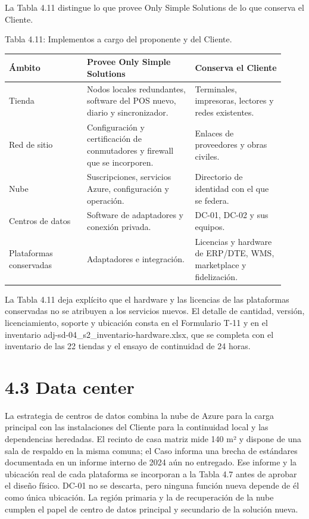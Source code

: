 \documentclass[11pt]{article}
\begin{document}
La Tabla 4.11 distingue lo que provee Only Simple Solutions de lo que conserva el Cliente.

Tabla 4.11: Implementos a cargo del proponente y del Cliente.

\begin{longtable}{@{}p{0.26\linewidth}p{0.36\linewidth}p{0.30\linewidth}@{}}
\toprule Ámbito & Provee Only Simple Solutions & Conserva el Cliente \\
\midrule\endhead\bottomrule\endlastfoot
Tienda & Nodos locales redundantes, software del POS nuevo, diario y sincronizador. & Terminales, impresoras, lectores y redes existentes. \\
Red de sitio & Configuración y certificación de conmutadores y firewall que se incorporen. & Enlaces de proveedores y obras civiles. \\
Nube & Suscripciones, servicios Azure, configuración y operación. & Directorio de identidad con el que se federa. \\
Centros de datos & Software de adaptadores y conexión privada. & DC-01, DC-02 y sus equipos. \\
Plataformas conservadas & Adaptadores e integración. & Licencias y hardware de ERP/DTE, WMS, marketplace y fidelización. \\
\end{longtable}

La Tabla 4.11 deja explícito que el hardware y las licencias de las plataformas conservadas no se atribuyen a los servicios nuevos. El detalle de cantidad, versión, licenciamiento, soporte y ubicación consta en el Formulario T-11 y en el inventario adj-sd-04\_s2\_inventario-hardware.xlsx, que se completa con el inventario de las 22 tiendas y el ensayo de continuidad de 24 horas.

\section{4.3 Data center}

La estrategia de centros de datos combina la nube de Azure para la carga principal con las instalaciones del Cliente para la continuidad local y las dependencias heredadas. El recinto de casa matriz mide 140 m² y dispone de una sala de respaldo en la misma comuna; el Caso informa una brecha de estándares documentada en un informe interno de 2024 aún no entregado. Ese informe y la ubicación real de cada plataforma se incorporan a la Tabla 4.7 antes de aprobar el diseño físico. DC-01 no se descarta, pero ninguna función nueva depende de él como única ubicación. La región primaria y la de recuperación de la nube cumplen el papel de centro de datos principal y secundario de la solución nueva.
\end{document}
